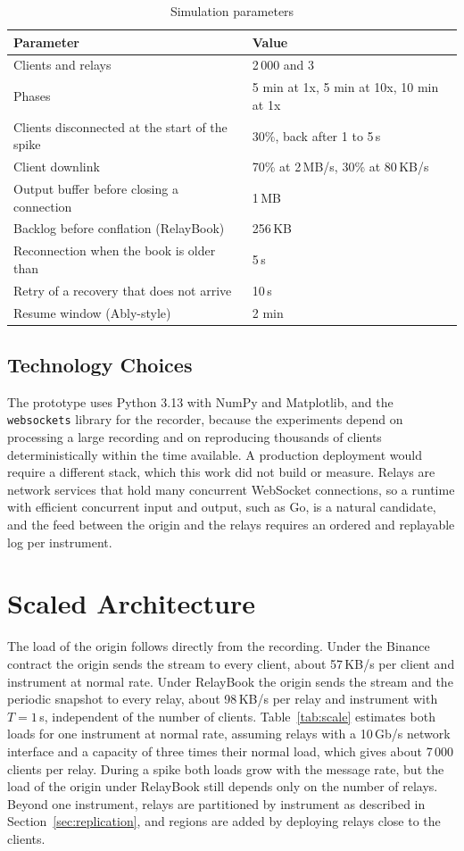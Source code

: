 \documentclass[conference]{IEEEtran}
\begin{document}
\begin{table}[t]
\caption{Simulation parameters}
\label{tab:params}
\centering
\footnotesize
\begin{tabular}{p{4.6cm}p{2.6cm}}
\toprule
Parameter & Value \\
\midrule
Clients and relays & 2\,000 and 3 \\
Phases & 5 min at 1x, 5 min at 10x, 10 min at 1x \\
Clients disconnected at the start of the spike & 30\%, back after 1 to 5\,s \\
Client downlink & 70\% at 2\,MB/s, 30\% at 80\,KB/s \\
Output buffer before closing a connection & 1\,MB \\
Backlog before conflation (RelayBook) & 256\,KB \\
Reconnection when the book is older than & 5\,s \\
Retry of a recovery that does not arrive & 10\,s \\
Resume window (Ably-style) & 2 min \\
\bottomrule
\end{tabular}
\end{table}

\subsection{Technology Choices}

The prototype uses Python 3.13 with NumPy and Matplotlib, and the \texttt{websockets} library for the recorder, because the experiments depend on processing a large recording and on reproducing thousands of clients deterministically within the time available. A production deployment would require a different stack, which this work did not build or measure. Relays are network services that hold many concurrent WebSocket connections, so a runtime with efficient concurrent input and output, such as Go, is a natural candidate, and the feed between the origin and the relays requires an ordered and replayable log per instrument.

\section{Scaled Architecture}

The load of the origin follows directly from the recording. Under the Binance contract the origin sends the stream to every client, about 57\,KB/s per client and instrument at normal rate. Under RelayBook the origin sends the stream and the periodic snapshot to every relay, about 98\,KB/s per relay and instrument with $T = 1$\,s, independent of the number of clients. Table~\ref{tab:scale} estimates both loads for one instrument at normal rate, assuming relays with a 10\,Gb/s network interface and a capacity of three times their normal load, which gives about 7\,000 clients per relay. During a spike both loads grow with the message rate, but the load of the origin under RelayBook still depends only on the number of relays. Beyond one instrument, relays are partitioned by instrument as described in Section~\ref{sec:replication}, and regions are added by deploying relays close to the clients.
\end{document}
